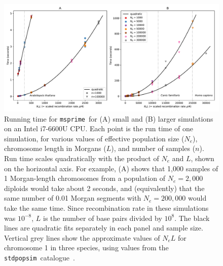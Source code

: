 \documentclass{article}
\newcommand{\msprime}[0]{\texttt{msprime}}
\newcommand{\stdpopsim}[0]{\texttt{stdpopsim}}
\begin{document}
\begin{figure}
\begin{center}
    \includegraphics[width=\textwidth]{figures/ancestry-perf}
\end{center}
\caption{\label{fig-ancestry-perf}
    Running time for \msprime\
    for (A) small and (B) larger simulations on an Intel i7-6600U CPU.
    Each point is the run time of one simulation,
    for various values of effective population size ($N_e$),
    chromosome length in Morgans ($L$), and number of samples ($n$).
    Run time scales quadratically with the product of $N_e$ and $L$,
    shown on the horizontal axis. For example, (A) shows that
    1,000 samples of 1 Morgan-length chromosomes
    from a population of $N_e=2,000$ diploids
    would take about 2 seconds, and (equivalently) that the same number of
    0.01 Morgan segments with $N_e=200,000$ would take the same time.
    Since recombination rate in these simulations was $10^{-8}$,
    $L$ is the number of base pairs divided by $10^8$.
    The black lines are quadratic fits separately in each panel
    and sample size. Vertical grey lines show the approximate values of
    $N_e L$ for chromosome 1 in three species, using values from
    the \stdpopsim\ catalogue~\citep{adrion2020community}.
}
\end{figure}

\end{document}
